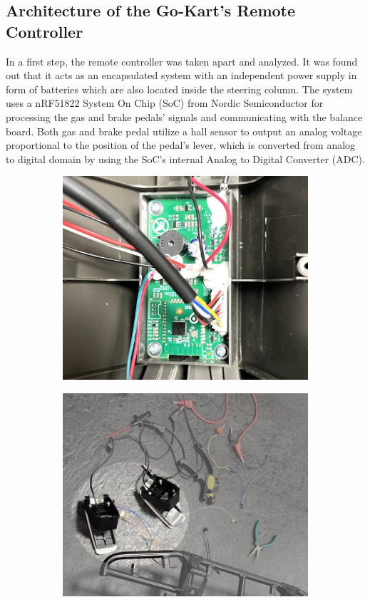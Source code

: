 \subsection{Architecture of the Go-Kart's Remote Controller}
In a first step, the remote controller was taken apart and analyzed.
It was found out that it acts as an encapsulated system with an independent power supply in form of batteries which are also located inside the steering column.
The system uses a nRF51822 System On Chip (SoC) from Nordic Semiconductor for processing the gas and brake pedals' signals and communicating with the balance board.
Both gas and brake pedal utilize a hall sensor to output an analog voltage proportional to the position of the pedal's lever, which is converted from analog to digital domain by using the SoC's internal Analog to Digital Converter (ADC).
\begin{figure}[!htbp]
\centering
\begin{subfigure}{0.24\textwidth}
  \centering
  \includegraphics[width=\textwidth]{images/remote_controller_board2.jpg}
\end{subfigure}
\begin{subfigure}{0.24\textwidth}
  \centering
  \includegraphics[width=\textwidth]{images/gas_and_brake_pedals.jpg}

\end{subfigure}
\end{figure}
